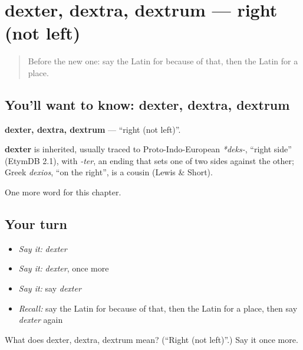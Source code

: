 \section[dexter, dextra, dextrum]{dexter, dextra, dextrum — right (not left)}

\label{lesson:LA-C114-dexter}



\begin{quote}
Before the new one: say the Latin for because of that, then the Latin for a place.
\end{quote}

\subsection*{You'll want to know: dexter, dextra, dextrum}
\textbf{dexter, dextra, dextrum} — \textquotedblleft{}right (not left)\textquotedblright{}.

\begin{cousinweb}
\textbf{dexter} is inherited, usually traced to Proto-Indo-European \emph{*deks-}, \textquotedblleft{}right side\textquotedblright{} (EtymDB 2.1), with \emph{-ter}, an ending that sets one of two sides against the other; Greek \emph{dexios}, \textquotedblleft{}on the right\textquotedblright{}, is a cousin (Lewis \& Short).
\end{cousinweb}

\begin{grammarlens}[title={What you've built}]
One more word for this chapter.
\end{grammarlens}

\subsection*{Your turn}
\begin{itemize}
\raggedright
  \item \emph{Say it:} \emph{dexter}
  \item \emph{Say it:} \emph{dexter}, once more
  \item \emph{Say it:} say \emph{dexter}
  \item \emph{Recall:} say the Latin for because of that, then the Latin for a place, then say \emph{dexter} again
\end{itemize}

\begin{tcolorbox}[breakable,colback=teal!4,colframe=teal!35!black,title={Before you move on}]
What does dexter, dextra, dextrum mean? (\textquotedblleft{}Right (not left)\textquotedblright{}.) Say it once more.
\end{tcolorbox}
